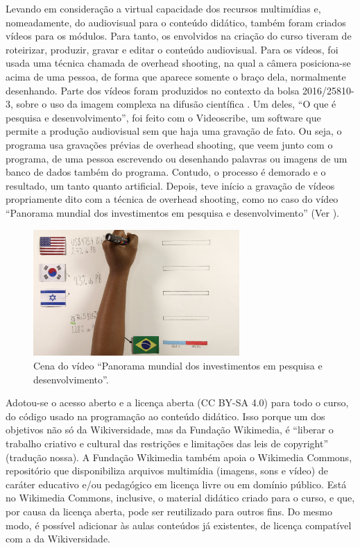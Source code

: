 \documentclass{textolivre}
\begin{document}
Levando em consideração a virtual capacidade dos recursos multimídias e, nomeadamente, do audiovisual para o conteúdo didático, também foram criados vídeos para os módulos. Para tanto, os envolvidos na criação do curso tiveram de roteirizar, produzir, gravar e editar o conteúdo audiovisual. Para os vídeos, foi usada uma técnica chamada de overhead shooting, na qual a câmera posiciona-se acima de uma pessoa, de forma que aparece somente o braço dela, normalmente desenhando. Parte dos vídeos foram produzidos no contexto da bolsa 2016/25810-3, sobre o uso da imagem complexa na difusão científica \cite{ebohon2017}. Um deles, “O que é pesquisa e desenvolvimento”, foi feito com o Videoscribe, um software que permite a produção audiovisual sem que haja uma gravação de fato. Ou seja, o programa usa gravações prévias de overhead shooting, que veem junto com o programa, de uma pessoa escrevendo ou desenhando palavras ou imagens de um banco de dados também do programa. Contudo, o processo é demorado e o resultado, um tanto quanto artificial. Depois, teve início a gravação de vídeos propriamente dito com a técnica de overhead shooting, como no caso do vídeo “Panorama mundial dos investimentos em pesquisa e desenvolvimento” (Ver ).

\begin{figure}[htbp]
\centering
\includegraphics[width=0.7\textwidth]{fig04.png}
\caption{Cena do vídeo “Panorama mundial dos investimentos em pesquisa e desenvolvimento”.}
\label{fig04}
\end{figure}

Adotou-se o acesso aberto e a licença aberta (CC BY-SA 4.0) para todo o curso, do código usado na programação ao conteúdo didático. Isso porque um dos objetivos não só da Wikiversidade, mas da Fundação Wikimedia, é “liberar o trabalho criativo e cultural das restrições e limitações das leis de copyright” \cite[s.p.]{friesen2008} (tradução nossa). A Fundação Wikimedia também apoia o Wikimedia Commons, repositório que disponibiliza arquivos multimídia (imagens, sons e vídeo) de caráter educativo e/ou pedagógico em licença livre ou em domínio público. Está no Wikimedia Commons, inclusive, o material didático criado para o curso, e que, por causa da licença aberta, pode ser reutilizado para outros fins. Do mesmo modo, é possível adicionar às aulas conteúdos já existentes, de licença compatível com a da Wikiversidade.
\end{document}

